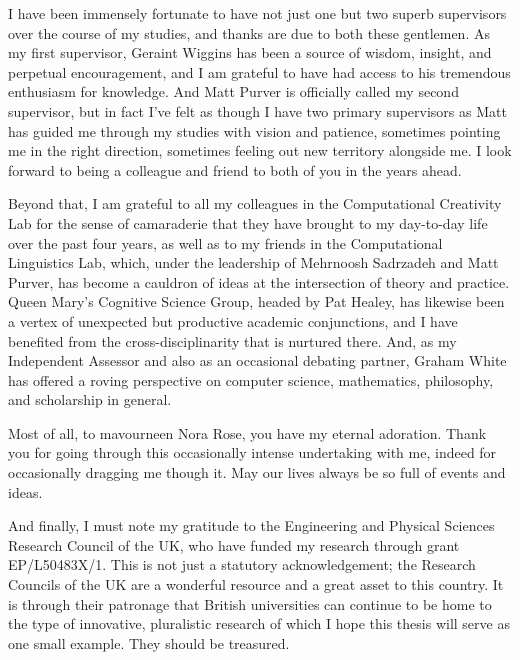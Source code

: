 %
\begin{acknowledgments}
%
I have been immensely fortunate to have not just one but two superb supervisors over the course of my studies, and thanks are due to both these gentlemen.  As my first supervisor, Geraint Wiggins has been a source of wisdom, insight, and perpetual encouragement, and I am grateful to have had access to his tremendous enthusiasm for knowledge.  And Matt Purver is officially called my second supervisor, but in fact I've felt as though I have two primary supervisors as Matt has guided me through my studies with vision and patience, sometimes pointing me in the right direction, sometimes feeling out new territory alongside me.  I look forward to being a colleague and friend to both of you in the years ahead.

Beyond that, I am grateful to all my colleagues in the Computational Creativity Lab for the sense of camaraderie that they have brought to my day-to-day life over the past four years, as well as to my friends in the Computational Linguistics Lab, which, under the leadership of Mehrnoosh Sadrzadeh and Matt Purver, has become a cauldron of ideas at the intersection of theory and practice.  Queen Mary's Cognitive Science Group, headed by Pat Healey, has likewise been a vertex of unexpected but productive academic conjunctions, and I have benefited from the cross-disciplinarity that is nurtured there.  And, as my Independent Assessor and also as an occasional debating partner, Graham White has offered a roving perspective on computer science, mathematics, philosophy, and scholarship in general.

Most of all, to mavourneen Nora Rose, you have my eternal adoration.  Thank you for going through this occasionally intense undertaking with me, indeed for occasionally dragging me though it.  May our lives always be so full of events and ideas.

And finally, I must note my gratitude to the Engineering and Physical Sciences Research Council of the UK, who have funded my research through grant EP/L50483X/1.  This is not just a statutory acknowledgement; the Research Councils of the UK are a wonderful resource and a great asset to this country.  It is through their patronage that British universities can continue to be home to the type of innovative, pluralistic research of which I hope this thesis will serve as one small example.  They should be treasured.

\end{acknowledgments}

